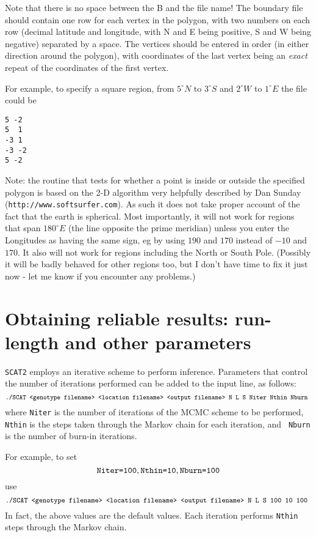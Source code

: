 \documentclass[11pt,titlepage,times,letterpaper]{article}
\def\SCAT{{\tt SCAT2} }
\begin{document}
Note that there is no space between the B and the file name!
The boundary file should contain one row for each vertex in the
polygon, with two numbers on each row (decimal latitude and longitude,
with N and E being positive, S and W being negative) separated by a
space. The vertices should be entered in order (in either direction
around the polygon), with coordinates of the last vertex being an {\it
exact} repeat of the coordinates of the first vertex.

For example, to specify a square region, from $5^\circ N$ to $3^\circ S$ and
$2^\circ W$ to $1^\circ E$ the file could be
\begin{verbatim}
5 -2
5  1
-3 1
-3 -2
5 -2
\end{verbatim}

Note: the routine that tests for whether a point is inside or outside
the specified polygon is based on the 2-D algorithm very helpfully
described by Dan Sunday ({\tt http://www.softsurfer.com}). As such it
does not take proper account of the fact that the earth is
spherical. Most importantly, it will not work for regions that span
$180^\circ E$ (the line opposite the prime meridian) unless you enter
the Longitudes as having the same sign, eg by using $190$ and $170$
instead of $-10$ and $170$. It also will not work for regions
including the North or South Pole.  (Possibly it will be badly behaved
for other regions too, but I don't have time to fix it just now - let
me know if you encounter any problems.)


\section{Obtaining reliable results: run-length and other parameters}
\label{HowLong}

\SCAT employs an iterative scheme to perform inference. 
Parameters that control the number of iterations performed
can be added to the input line, as follows:
$$\text{{\small \tt ./SCAT <genotype filename> <location filename> <output
filename> N L S Niter Nthin Nburn }}$$ where {\tt Niter} is the number
of iterations of the MCMC scheme to be performed, {\tt Nthin} is the
steps taken through the Markov chain for each iteration, and {\tt
Nburn} is the number of burn-in iterations.

For example, to set
$$\text{{\tt Niter=100}}, \text{{\tt Nthin=10}}, \text{{\tt Nburn=100}}$$
use
$$\text{{\tt \small./SCAT <genotype filename> <location filename> <output
filename> N L S 100 10 100 }}$$ 
In fact, the above values are the
default values. Each iteration performs {\tt Nthin}
steps through the Markov chain.
\end{document}
